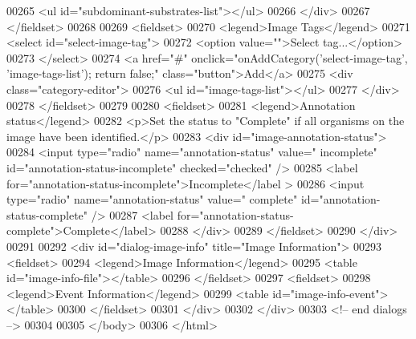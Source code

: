 \begin{DoxyCode}
00265                     <ul \textcolor{keywordtype}{id}=\textcolor{stringliteral}{"subdominant-substrates-list"}></ul>
00266                 </div>
00267             </fieldset>
00268 
00269             <fieldset>
00270                 <legend>Image Tags</legend>
00271                 <select \textcolor{keywordtype}{id}=\textcolor{stringliteral}{"select-image-tag"}>
00272                     <option value=\textcolor{stringliteral}{""}>Select tag...</option>
00273                 </select>
00274                 <a href=\textcolor{stringliteral}{"#"} onclick=\textcolor{stringliteral}{"onAddCategory('select-image-tag',
       'image-tags-list'); return false;"} \textcolor{keyword}{class}=\textcolor{stringliteral}{"button"}>Add</a>
00275                 <div \textcolor{keyword}{class}=\textcolor{stringliteral}{"category-editor"}>
00276                     <ul \textcolor{keywordtype}{id}=\textcolor{stringliteral}{"image-tags-list"}></ul>
00277                 </div>
00278             </fieldset>
00279 
00280             <fieldset>
00281                 <legend>Annotation status</legend>
00282                 <p>Set the status to \textcolor{stringliteral}{"Complete"} \textcolor{keywordflow}{if} all organisms on the image 
      have been identified.</p>
00283                 <div \textcolor{keywordtype}{id}=\textcolor{stringliteral}{"image-annotation-status"}>
00284                     <input type=\textcolor{stringliteral}{"radio"} name=\textcolor{stringliteral}{"annotation-status"} value=\textcolor{stringliteral}{"
      incomplete"} \textcolor{keywordtype}{id}=\textcolor{stringliteral}{"annotation-status-incomplete"} checked=\textcolor{stringliteral}{"checked"} />
00285                     <label \textcolor{keywordflow}{for}=\textcolor{stringliteral}{"annotation-status-incomplete"}>Incomplete</label
      >
00286                     <input type=\textcolor{stringliteral}{"radio"} name=\textcolor{stringliteral}{"annotation-status"} value=\textcolor{stringliteral}{"
      complete"} \textcolor{keywordtype}{id}=\textcolor{stringliteral}{"annotation-status-complete"} />
00287                     <label \textcolor{keywordflow}{for}=\textcolor{stringliteral}{"annotation-status-complete"}>Complete</label>
00288                 </div>
00289             </fieldset>
00290         </div>
00291 
00292         <div \textcolor{keywordtype}{id}=\textcolor{stringliteral}{"dialog-image-info"} title=\textcolor{stringliteral}{"Image Information"}>
00293             <fieldset>
00294                 <legend>Image Information</legend>
00295                 <table \textcolor{keywordtype}{id}=\textcolor{stringliteral}{"image-info-file"}></table>
00296             </fieldset>
00297             <fieldset>
00298                 <legend>Event Information</legend>
00299                 <table \textcolor{keywordtype}{id}=\textcolor{stringliteral}{"image-info-event"}></table>
00300             </fieldset>
00301         </div>
00302     </div>
00303     <!-- end dialogs -->
00304 
00305   </body>
00306 </html>
\end{DoxyCode}

